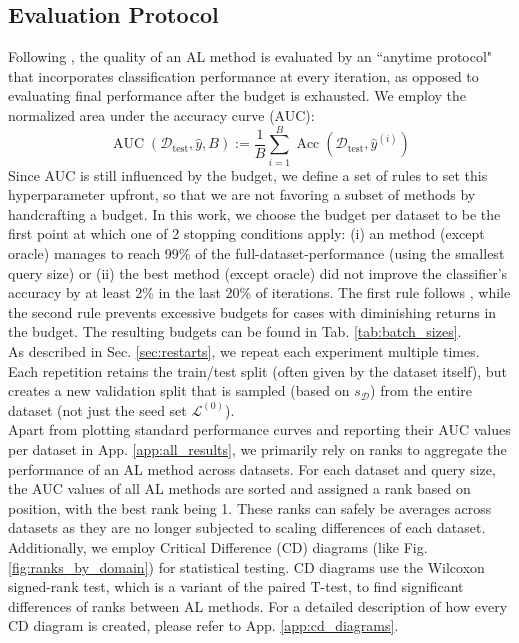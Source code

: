 \documentclass[]{article}
\newcommand{\D}{\mathcal{D}}
\newcommand{\LL}{\mathcal{L}}
\newcommand{\test}{\text{test}}
\begin{document}
\subsection{Evaluation Protocol}\label{sec:evaluation}
Following \cite{zhou2021towards}, the quality of an AL method is evaluated by an ``anytime protocol" that incorporates classification performance at every iteration, as opposed to evaluating final performance after the budget is exhausted.
We employ the normalized area under the accuracy curve (AUC):
\begin{equation}\label{eq:auc}
	\operatorname{AUC}(\D_\test, \hat y, B) := \frac{1}{B} \sum_{i=1}^{B} \operatorname{Acc}(\D_\test, \hat y^{(i)})
\end{equation}
Since AUC is still influenced by the budget, we define a set of rules to set this hyperparameter upfront, so that we are not favoring a subset of methods by handcrafting a budget.
In this work, we choose the budget per dataset to be the first point at which one of 2 stopping conditions apply: (i) an method (except oracle) manages to reach 99\% of the full-dataset-performance (using the smallest query size) or (ii) the best method (except oracle) did not improve the classifier's accuracy by at least 2\% in the last 20\% of iterations.
The first rule follows \cite{ji2023randomness}, while the second rule prevents excessive budgets for cases with diminishing returns in the budget.
The resulting budgets can be found in Tab. \ref{tab:batch_sizes}. \\ [1mm]
As described in Sec. \ref{sec:restarts}, we repeat each experiment multiple times.
Each repetition retains the train/test split (often given by the dataset itself), but creates a new validation split that is sampled (based on $s_\D$) from the entire dataset (not just the seed set $\LL^{(0)}$). \\ [1mm]
%
Apart from plotting standard performance curves and reporting their AUC values per dataset in App. \ref{app:all_results}, we primarily rely on ranks to aggregate the performance of an AL method across datasets.
For each dataset and query size, the AUC values of all AL methods are sorted and assigned a rank based on position, with the best rank being 1.
These ranks can safely be averages across datasets as they are no longer subjected to scaling differences of each dataset.
Additionally, we employ Critical Difference (CD) diagrams (like Fig. \ref{fig:ranks_by_domain}) for statistical testing.
CD diagrams \cite{IsmailFawaz2018deep} use the Wilcoxon signed-rank test, which is a variant of the paired T-test, to find significant differences of ranks between AL methods.
For a detailed description of how every CD diagram is created, please refer to App. \ref{app:cd_diagrams}. 
\end{document}
